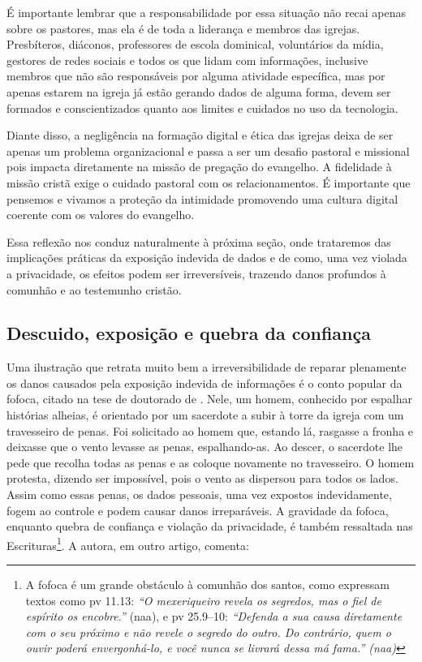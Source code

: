 É importante lembrar que a responsabilidade por essa situação não recai apenas sobre os pastores, mas ela é de toda a liderança e membros das igrejas. Presbíteros, diáconos, professores de escola dominical, voluntários da mídia, gestores de redes sociais e todos os que lidam com informações, inclusive membros que não são responsáveis por alguma atividade específica, mas por apenas estarem na igreja já estão gerando dados de alguma forma, devem ser formados e conscientizados quanto aos limites e cuidados no uso da tecnologia.

Diante disso, a negligência na formação digital e ética das igrejas deixa de ser apenas um problema organizacional e passa a ser um desafio pastoral e missional pois impacta diretamente na missão de pregação do evangelho. A fidelidade à missão cristã exige o cuidado pastoral com os relacionamentos. É importante que pensemos e vivamos a proteção da intimidade promovendo uma cultura digital coerente com os valores do evangelho.

Essa reflexão nos conduz naturalmente à próxima seção, onde trataremos das implicações práticas da exposição indevida de dados e de como, uma vez violada a privacidade, os efeitos podem ser irreversíveis, trazendo danos profundos à comunhão e ao testemunho cristão.

\subsection{Descuido, exposição e quebra da confiança}

Uma ilustração que retrata muito bem a irreversibilidade de reparar plenamente os danos causados pela exposição indevida de informações é o conto popular da fofoca, citado na tese de doutorado de . Nele, um homem, conhecido por espalhar histórias alheias, é orientado por um sacerdote a subir à torre da igreja com um travesseiro de penas. Foi solicitado ao homem que, estando lá, rasgasse a fronha e deixasse que o vento levasse as penas, espalhando-as. Ao descer, o sacerdote lhe pede que recolha todas as penas e as coloque novamente no travesseiro. O homem protesta, dizendo ser impossível, pois o vento as dispersou para todos os lados. Assim como essas penas, os dados pessoais, uma vez expostos indevidamente, fogem ao controle e podem causar danos irreparáveis. A gravidade da fofoca, enquanto quebra de confiança e violação da privacidade, é também ressaltada nas Escrituras\footnote{A fofoca é um grande obstáculo à comunhão dos santos, como expressam textos como \gls{pv} 11.13: \textit{``O mexeriqueiro revela os segredos, mas o fiel de espírito os encobre.''} (\gls{naa}), e \gls{pv} 25.9–10: \textit{``Defenda a sua causa diretamente com o seu próximo e não revele o segredo do outro. Do contrário, quem o ouvir poderá envergonhá-lo, e você nunca se livrará dessa má fama.'' (\gls{naa})}}. A autora, em outro artigo, comenta:

